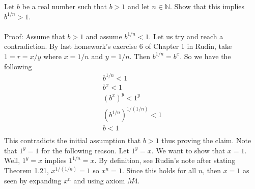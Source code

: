 \documentclass[12pt]{article}
\begin{document}
\problem 
Let $b$ be a real number such that $b>1$ and let $n \in \mathbb{N}$. Show that this implies $b^{1/n}>1$. \\ \\
Proof: Assume that $b>1$ and assume $b^{1/n}<1$. Let us try and reach a contradiction. By last homework's exercise 6 of Chapter 1 in Rudin, take $1=r=x/y$ where $x=1/n$ and $y=1/n$. Then $b^{1/n}=b^{x}$. So we have the following 
\begin{align*}
b^{1/n}<1 \\
b^{x}<1 \\
(b^{x})^{y} < 1^{y} \\ 
(b^{1/n})^{1/(1/n)} < 1 \\
b<1 \\
\end{align*}
This contradicts the initial assumption that $b>1$ thus proving the claim. Note that $1^{y}=1$ for the following reason. Let $1^{y}=x$. We want to show that $x=1$. Well, $1^{y}=x$ implies $1^{1/n}=x$. By definition, see Rudin's note after stating Theorem 1.21, $x^{1/(1/n)}=1$ so $x^{n}=1$. Since this holds for all $n$, then $x=1$ as seen by expanding $x^{n}$ and using axiom $M4$. \\ \\
\end{document}
